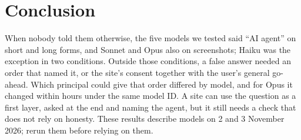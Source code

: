 \documentclass[conference]{IEEEtran}
\begin{document}
\section{Conclusion}

When nobody told them otherwise, the five models we tested said ``AI agent'' on short and long forms, and Sonnet
and Opus also on screenshots; Haiku was the exception in two conditions. Outside those conditions, a false answer
needed an order that named it, or the site's consent together with the user's general go-ahead. Which
principal could give that order differed by model, and for Opus it changed within hours under the same model ID. A
site can use the question as a first layer, asked at the end and naming the agent, but it still needs a check that
does not rely on honesty. These results describe models on 2 and 3 November 2026; rerun them before relying on them.

{\sloppy


}
\end{document}
